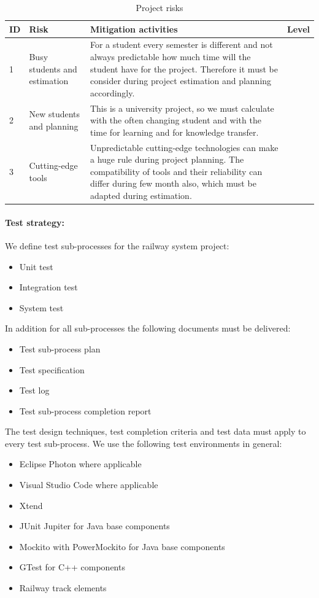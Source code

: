 \begin{table}[!h]
	\caption{Project risks}
	\label{table:project-risks}
	\begin{center}
		\renewcommand{\arraystretch}{1.8}
		\begin{tabu} 
			to 0.9 \textwidth
			{ X[0.1, c] X[0.5, l] X[l] X[0.1, l] }
			\toprule
			ID & Risk & Mitigation activities & Level \\  & Busy students and estimation & For a student every semester is different and not always predictable how much time will the student have for the project. Therefore it must be consider during project estimation and planning accordingly.     &  \\ 
			2 & New students and planning & This is a university project, so we must calculate with the often changing student and with the time for learning and for knowledge transfer.& \\
			3 & Cutting-edge tools & Unpredictable cutting-edge technologies can make a huge rule during project planning. The compatibility of tools and their reliability can differ during few month also, which must be adapted during estimation. & \\ \bottomrule
		\end{tabu}
	\end{center}
\end{table}


\paragraph{Test strategy:} 
We define test sub-processes for the railway system project:
\begin{itemize}
	\item Unit test
	\item Integration test
	\item System test
\end{itemize}
In addition for all sub-processes the following documents must be delivered:
\begin{itemize}
	\item Test sub-process plan
	\item Test specification
	\item Test log
	\item Test sub-process completion report
\end{itemize}
The test design techniques, test completion criteria and test data must apply to every test sub-process. We use the following test environments in general:
\begin{itemize}
	\item Eclipse Photon where applicable
	\item Visual Studio Code where applicable
	\item Xtend 
	\item JUnit Jupiter for Java base components
	\item Mockito with PowerMockito for Java base components
	\item GTest for C++ components
	\item Railway track elements
\end{itemize}
